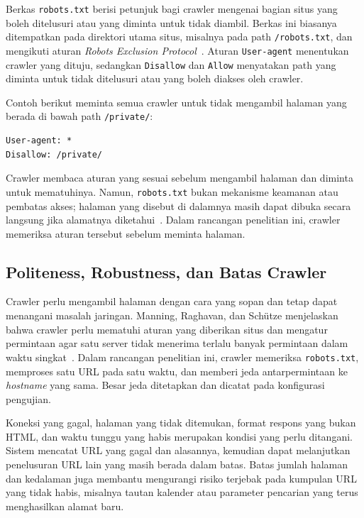 Berkas \texttt{robots.txt} berisi petunjuk bagi crawler mengenai bagian situs yang boleh ditelusuri atau yang diminta untuk tidak diambil. Berkas ini biasanya ditempatkan pada direktori utama situs, misalnya pada path \texttt{/robots.txt}, dan mengikuti aturan \textit{Robots Exclusion Protocol}~\cite{rfc:22:robots}. Aturan \texttt{User-agent} menentukan crawler yang dituju, sedangkan \texttt{Disallow} dan \texttt{Allow} menyatakan path yang diminta untuk tidak ditelusuri atau yang boleh diakses oleh crawler.

Contoh berikut meminta semua crawler untuk tidak mengambil halaman yang berada di bawah path \texttt{/private/}:

\begin{lstlisting}[caption=Contoh aturan robots.txt]
User-agent: *
Disallow: /private/
\end{lstlisting}

Crawler membaca aturan yang sesuai sebelum mengambil halaman dan diminta untuk mematuhinya. Namun, \texttt{robots.txt} bukan mekanisme keamanan atau pembatas akses; halaman yang disebut di dalamnya masih dapat dibuka secara langsung jika alamatnya diketahui~\cite{rfc:22:robots}. Dalam rancangan penelitian ini, crawler memeriksa aturan tersebut sebelum meminta halaman.

\subsection{Politeness, Robustness, dan Batas Crawler}

Crawler perlu mengambil halaman dengan cara yang sopan dan tetap dapat menangani masalah jaringan. Manning, Raghavan, dan Schütze menjelaskan bahwa crawler perlu mematuhi aturan yang diberikan situs dan mengatur permintaan agar satu server tidak menerima terlalu banyak permintaan dalam waktu singkat~\cite{manning:08:introir}. Dalam rancangan penelitian ini, crawler memeriksa \texttt{robots.txt}, memproses satu URL pada satu waktu, dan memberi jeda antarpermintaan ke \textit{hostname} yang sama. Besar jeda ditetapkan dan dicatat pada konfigurasi pengujian.

Koneksi yang gagal, halaman yang tidak ditemukan, format respons yang bukan HTML, dan waktu tunggu yang habis merupakan kondisi yang perlu ditangani. Sistem mencatat URL yang gagal dan alasannya, kemudian dapat melanjutkan penelusuran URL lain yang masih berada dalam batas. Batas jumlah halaman dan kedalaman juga membantu mengurangi risiko terjebak pada kumpulan URL yang tidak habis, misalnya tautan kalender atau parameter pencarian yang terus menghasilkan alamat baru.

